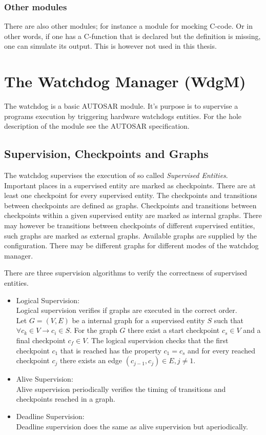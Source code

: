 \subsection{Other modules}
\label{APP:SEC:OTHERMODULES}
There are also other modules; for instance a module for mocking C-code. Or in
other words, if one has a C-function that is declared but the
definition is missing, one can simulate its output. This is
however not used in this thesis.



\chapter{The Watchdog Manager (WdgM)}
\label{APPENDIX:WDGM}
The watchdog is a basic AUTOSAR module. It's purpose is to supervise a programs
execution by triggering hardware watchdogs entities. For the hole description of
the module see the AUTOSAR specification.

\section{Supervision, Checkpoints and Graphs}
The watchdog supervises the execution of so called \emph{Supervised Entities}.
Important places in a supervised entity are marked as checkpoints. There are at
least one checkpoint for every supervised entity. The checkpoints and
transitions between checkpoints are defined as graphs. Checkpoints and
transitions between checkpoints within a given supervised entity are marked as
internal graphs. There may however be transitions between checkpoints of
different supervised entities, such graphs are marked as external graphs.
Available graphs are supplied by the configuration. There may be different
graphs for different modes of the watchdog manager.

There are three supervision algorithms to verify the correctness of supervised
entities.
\begin{itemize}
\item Logical Supervision: \\
Logical supervision verifies if graphs are executed in the correct order. \\ Let
$G = (V,E)$ be a internal graph for a supervised entity $S$ such that $\forall c_k
\in V \rightarrow c_i \in S$. For the graph $G$ there exist a start checkpoint
$c_s \in V$ and a final checkpoint $c_f \in V$. The logical supervision
checks that the first checkpoint $c_1$ that is reached has the property $c_1 =
c_s$ and for every reached checkpoint $c_j$ there exists an edge
$(c_{j-1},c_{j}) \in E, j \neq 1$.
\item Alive Supervision: \\
  Alive supervision periodically verifies the timing of transitions and
checkpoints reached in a graph.
\item Deadline Supervision: \\
  Deadline supervision does the same as alive supervision but aperiodically.
\end{itemize}

